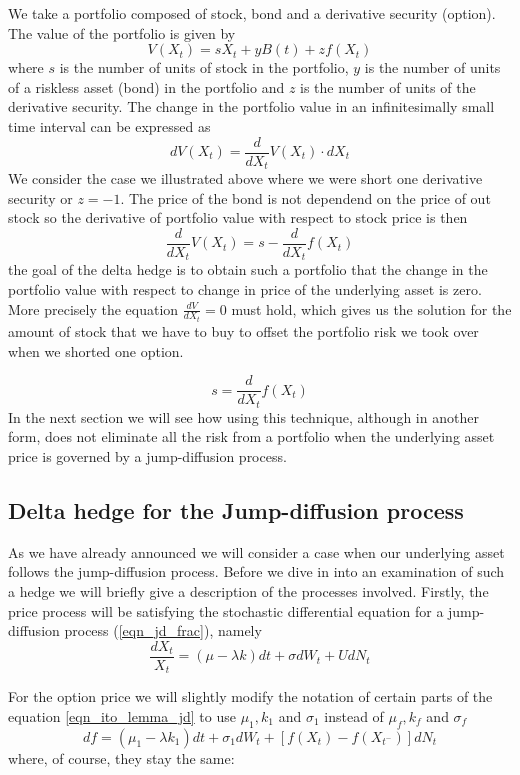 \documentclass[times, utf8, diplomski]{fer}
\begin{document}
We take a portfolio composed of stock, bond and a derivative security (option). The value of the portfolio is given by
$$ V(X_t) = sX_t + yB(t) + zf(X_t)$$
where $s$ is the number of units of stock in the portfolio, $y$ is the number of units of a riskless asset (bond) in the portfolio and $z$ is the number of units of the derivative security.
The change in the portfolio value in an infinitesimally small time interval can be expressed as
$$
	dV(X_t) = \frac{d}{dX_t}V(X_t) \cdot dX_t
$$ We consider the case we illustrated above where we were short one derivative security or $z=-1$. The price of the bond is not dependend on the price of out stock so the derivative of portfolio value with respect to stock price is then $$ \frac{d}{dX_t}V(X_t) = s - \frac{d}{dX_t}f(X_t) $$ the goal of the delta hedge is to obtain such a portfolio that the change in the portfolio value with respect to change in price of the underlying asset is zero. More precisely the equation $\frac{dV}{dX_t} = 0$ must hold, which gives us the solution for the amount of stock that we have to buy to offset the portfolio risk we took over when we shorted one option. 

\begin{equation}
	s = \frac{d}{dX_t}f(X_t)
\end{equation} In the next section we will see how using this technique, although in another form, does not eliminate all the risk from a portfolio when the underlying asset price is governed by a jump-diffusion process. 

\subsection{Delta hedge for the Jump-diffusion process} \label{sec:delta_hedge_jd}
As we have already announced we will consider a case when our underlying asset follows the jump-diffusion process. Before we dive in into an examination of such a hedge we will briefly give a description of the processes involved. Firstly, the price process will be satisfying the stochastic differential equation for a jump-diffusion process (\ref{eqn_jd_frac}), namely
\begin{equation}\label{eqn_delta_hedge_x}
	\frac{dX_t}{X_t} = (\mu - \lambda k)dt + \sigma dW_t + UdN_t
\end{equation}

\noindent For the option price we will slightly modify the notation of certain parts of the equation \ref{eqn_ito_lemma_jd} to use $\mu_1, k_1$ and $\sigma_1$ instead of $\mu_f, k_f$ and $\sigma_f$
$$ df = (\mu_1 - \lambda k_1)dt + \sigma_1 dW_t + [f(X_t) - f(X_{t^-})]dN_t $$ where, of course, they stay the same:
\end{document}
